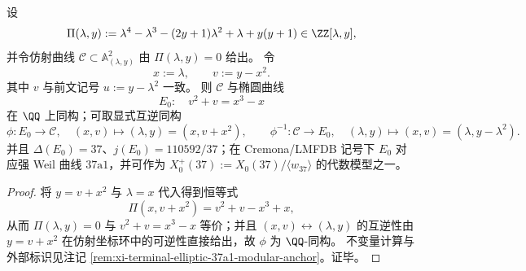 \begin{theorem}\label{thm:xi-terminal-zm-leyang-elliptic-modularity-37}
设
\[
\Pi(\lambda,y):=\lambda^{4}-\lambda^{3}-(2y+1)\lambda^{2}+\lambda+y(y+1)\in\ZZ[\lambda,y],
\]
并令仿射曲线 \(\mathcal C\subset\mathbb A^2_{(\lambda,y)}\) 由 \(\Pi(\lambda,y)=0\) 给出。
令
\[
x:=\lambda,\qquad v:=y-x^{2}.
\]
其中 \(v\) 与前文记号 \(u:=y-\lambda^2\) 一致。
则 \(\mathcal C\) 与椭圆曲线
\[
E_0:\quad v^{2}+v=x^{3}-x
\]
在 \(\QQ\) 上同构；可取显式互逆同构
\[
\phi:E_0\to \mathcal C,\quad (x,v)\longmapsto(\lambda,y)=(x,v+x^{2}),
\qquad
\phi^{-1}:\mathcal C\to E_0,\quad (\lambda,y)\longmapsto (x,v)=(\lambda,y-\lambda^{2}).
\]
并且 \(\Delta(E_0)=37\)、\(j(E_0)=110592/37\)；在 Cremona/LMFDB 记号下 \(E_0\) 对应强 Weil 曲线 \(37\mathrm a1\)，并可作为
\(
X_0^+(37):=X_0(37)/\langle w_{37}\rangle
\)
的代数模型之一。\cite{LMFDBEllipticCurve37a1}
\end{theorem}
\begin{proof}
将 \(y=v+x^2\) 与 \(\lambda=x\) 代入得到恒等式
\[
\Pi(x,v+x^2)=v^2+v-x^3+x,
\]
从而 \(\Pi(\lambda,y)=0\) 与 \(v^2+v=x^3-x\) 等价；并且 \((x,v)\leftrightarrow(\lambda,y)\) 的互逆性由 \(y=v+x^2\) 在仿射坐标环中的可逆性直接给出，故 \(\phi\) 为 \(\QQ\)-同构。
不变量计算与外部标识见注记 \ref{rem:xi-terminal-elliptic-37a1-modular-anchor}。证毕。
\end{proof}
\par

